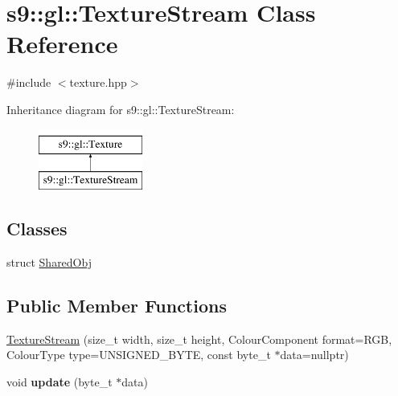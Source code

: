 \hypertarget{classs9_1_1gl_1_1TextureStream}{\section{s9\-:\-:gl\-:\-:Texture\-Stream Class Reference}
\label{classs9_1_1gl_1_1TextureStream}
}


{\ttfamily \#include $<$texture.\-hpp$>$}

Inheritance diagram for s9\-:\-:gl\-:\-:Texture\-Stream\-:\begin{figure}[H]
\begin{center}
\leavevmode
\includegraphics[height=2.000000cm]{classs9_1_1gl_1_1TextureStream}
\end{center}
\end{figure}
\subsection*{Classes}
\begin{DoxyCompactItemize}
\item 
struct \hyperlink{structs9_1_1gl_1_1TextureStream_1_1SharedObj}{Shared\-Obj}
\end{DoxyCompactItemize}
\subsection*{Public Member Functions}
\begin{DoxyCompactItemize}
\item 
\hyperlink{classs9_1_1gl_1_1TextureStream_af480e3b1df190227d46215955824dcc0}{Texture\-Stream} (size\-\_\-t width, size\-\_\-t height, Colour\-Component format=R\-G\-B, Colour\-Type type=U\-N\-S\-I\-G\-N\-E\-D\-\_\-\-B\-Y\-T\-E, const byte\-\_\-t $\ast$data=nullptr)
\item 
\hypertarget{classs9_1_1gl_1_1TextureStream_a7c4d18a5491e828be0ba1dcab9b77327}{void {\bfseries update} (byte\-\_\-t $\ast$data)}\label{classs9_1_1gl_1_1TextureStream_a7c4d18a5491e828be0ba1dcab9b77327}

\end{DoxyCompactItemize}
